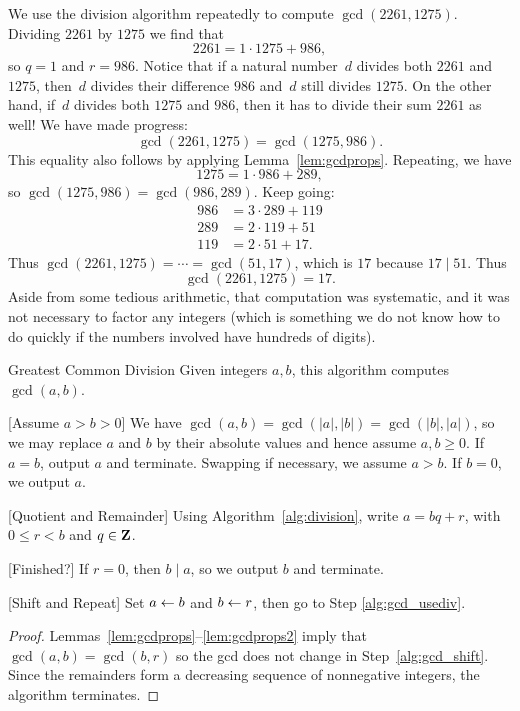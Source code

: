 We use the division algorithm repeatedly to compute
$\gcd(2261,1275)$.  Dividing $2261$ by $1275$ we find that
$$
  2261 = 1\cdot 1275 + 986,
$$
so $q=1$ and $r=986$.
Notice that if a natural number~$d$ divides both $2261$ and $1275$,
then~$d$ divides their difference $986$ and~$d$ still divides $1275$.
On the other hand, if~$d$ divides both $1275$ and $986$, then it has
to divide their sum $2261$ as well!  We have made progress:
$$\gcd(2261,1275) = \gcd(1275,986).$$
This equality also follows by applying
Lemma~\ref{lem:gcdprops}.
Repeating, we have
$$1275 = 1\cdot 986 + 289,$$
so $\gcd(1275,986)=\gcd(986,289)$.
Keep going:
\begin{align*}
986&=3\cdot 289 + 119\\
289&=2\cdot 119 + 51\\
119&=2\cdot 51 + 17.
\end{align*}
Thus $\gcd(2261,1275)=\cdots=\gcd(51,17)$, which is $17$
because $17\mid 51$.  Thus
$$\gcd(2261,1275)=17.$$
Aside from some tedious arithmetic, that computation was systematic,
and it was not necessary to factor any integers (which
is something we do not know how to do quickly if the numbers
involved have hundreds of digits).
\begin{algorithm}{Greatest Common Division}
\label{alg:gcd}
Given integers $a, b$, this algorithm computes $\gcd(a,b)$.
\begin{steps}
\item{} [Assume $a>b> 0$] We have
$\gcd(a,b) = \gcd(|a|,|b|) = \gcd(|b|,|a|)$,
so we may replace $a$ and $b$ by their absolute values and hence
assume $a, b \geq 0$.  If $a=b$, output $a$ and
terminate.  Swapping if necessary, we assume $a>b$. If $b=0$, we
output $a$.
\item{} [Quotient and Remainder] \label{alg:gcd_usediv} Using Algorithm~\ref{alg:division},
  write $a=bq+r$, with $0\leq r<b$ and $q\in\mathbf{Z}$.
\item{} [Finished?] If $r=0$, then $b\mid a$, so we output $b$ and terminate.
\item{} [Shift and Repeat] \label{alg:gcd_shift} Set $a\leftarrow b$ and $b \leftarrow r$, then go to
Step \ref{alg:gcd_usediv}.
\end{steps}
\end{algorithm}
\begin{proof}
Lemmas~\ref{lem:gcdprops}--\ref{lem:gcdprops2}
imply that $\gcd(a,b) = \gcd(b,r)$ so the gcd does not
change in Step~\ref{alg:gcd_shift}.
Since the remainders form a decreasing sequence of nonnegative
integers, the algorithm terminates.
\end{proof}

